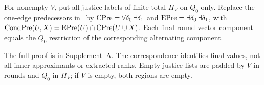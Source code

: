 \begin{lemma}\label{lem:round-bridge}
For nonempty $V$, put all justice labels of finite total $H_V$ on $Q_0$ only. Replace the
one-edge predecessors in~\cite[Eq.~(15)]{friendly} by
$\operatorname{CPre}=\forall\delta_0\,\exists\delta_1$ and
$\operatorname{EPre}=\exists\delta_0\,\exists\delta_1$, with
$\operatorname{CondPre}(U,X)=\operatorname{EPre}(U)\cap\operatorname{CPre}(U\cup X)$.
Each final round vector component equals the $Q_0$ restriction of the
corresponding alternating component.
\end{lemma}
The full proof is in Supplement~A.
The correspondence identifies final values, not all inner approximants
or extracted ranks. Empty justice lists are padded by $V$ in rounds
and $Q_0$ in $H_V$; if $V$ is empty, both regions are empty.
